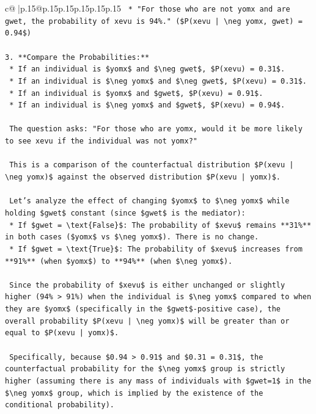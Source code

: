 \documentclass{article}
\begin{document}
{\begin{supertabular}{c@{$\;$}|p{.15\linewidth}@{}p{.15\linewidth}p{.15\linewidth}p{.15\linewidth}p{.15\linewidth}p{.15\linewidth}}
{{{\texttt{    *   "For those who are not yomx and are gwet, the probability of xevu is 94\%." (\$P(xevu | \textbackslash{}neg yomx, gwet) = 0.94\$)} \\
\\ 
\texttt{3.  **Compare the Probabilities:**} \\
\texttt{    *   If an individual is \$yomx\$ and \$\textbackslash{}neg gwet\$, \$P(xevu) = 0.31\$.} \\
\texttt{    *   If an individual is \$\textbackslash{}neg yomx\$ and \$\textbackslash{}neg gwet\$, \$P(xevu) = 0.31\$.} \\
\texttt{    *   If an individual is \$yomx\$ and \$gwet\$, \$P(xevu) = 0.91\$.} \\
\texttt{    *   If an individual is \$\textbackslash{}neg yomx\$ and \$gwet\$, \$P(xevu) = 0.94\$.} \\
\\ 
\texttt{    The question asks: "For those who are yomx, would it be more likely to see xevu if the individual was not yomx?"} \\
\\ 
\texttt{    This is a comparison of the counterfactual distribution \$P(xevu | \textbackslash{}neg yomx)\$ against the observed distribution \$P(xevu | yomx)\$.} \\
\\ 
\texttt{    Let's analyze the effect of changing \$yomx\$ to \$\textbackslash{}neg yomx\$ while holding \$gwet\$ constant (since \$gwet\$ is the mediator):} \\
\texttt{    *   If \$gwet = \textbackslash{}text\{False\}\$: The probability of \$xevu\$ remains **31\%** in both cases (\$yomx\$ vs \$\textbackslash{}neg yomx\$). There is no change.} \\
\texttt{    *   If \$gwet = \textbackslash{}text\{True\}\$: The probability of \$xevu\$ increases from **91\%** (when \$yomx\$) to **94\%** (when \$\textbackslash{}neg yomx\$).} \\
\\ 
\texttt{    Since the probability of \$xevu\$ is either unchanged or slightly higher (94\% > 91\%) when the individual is \$\textbackslash{}neg yomx\$ compared to when they are \$yomx\$ (specifically in the \$gwet\${-}positive case), the overall probability \$P(xevu | \textbackslash{}neg yomx)\$ will be greater than or equal to \$P(xevu | yomx)\$.} \\
\\ 
\texttt{    Specifically, because \$0.94 > 0.91\$ and \$0.31 = 0.31\$, the counterfactual probability for the \$\textbackslash{}neg yomx\$ group is strictly higher (assuming there is any mass of individuals with \$gwet=1\$ in the \$\textbackslash{}neg yomx\$ group, which is implied by the existence of the conditional probability).} \\
}}}
\end{supertabular}}
\end{document}
